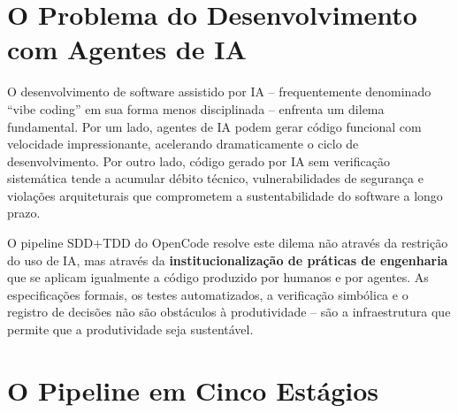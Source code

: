 \documentclass[12pt,a4paper,sumario=tradicional,openany]{abntex2}
\begin{document}
\section{O Problema do Desenvolvimento com Agentes de IA}

O desenvolvimento de software assistido por IA -- frequentemente denominado ``vibe coding'' em sua forma menos disciplinada \cite{garfinkel2026acm} -- enfrenta um dilema fundamental. Por um lado, agentes de IA podem gerar código funcional com velocidade impressionante, acelerando dramaticamente o ciclo de desenvolvimento. Por outro lado, código gerado por IA sem verificação sistemática tende a acumular débito técnico, vulnerabilidades de segurança e violações arquiteturais que comprometem a sustentabilidade do software a longo prazo.

O pipeline SDD+TDD do OpenCode resolve este dilema não através da restrição do uso de IA, mas através da \textbf{institucionalização de práticas de engenharia} que se aplicam igualmente a código produzido por humanos e por agentes. As especificações formais, os testes automatizados, a verificação simbólica e o registro de decisões não são obstáculos à produtividade -- são a infraestrutura que permite que a produtividade seja sustentável.

\section{O Pipeline em Cinco Estágios}
\end{document}
